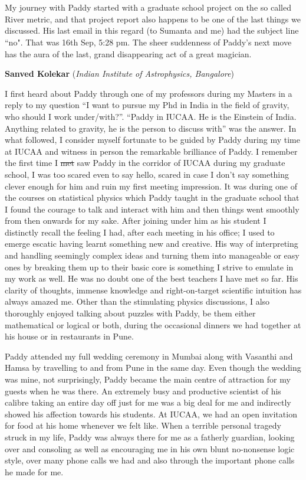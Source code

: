 \documentclass[prd, preprint, longbibliography, 11pt]{revtex4-1}
\begin{document}
\\
\\
My journey with Paddy started with a graduate school project on the so called River metric, and that project report also happens to be one of the last things we discussed. His last email in this regard (to Sumanta and me) had the subject line ``no". That was 16th Sep, 5:28 pm. The sheer suddenness of Paddy's next move has the aura of the last, grand disappearing act of a great magician. 

\bigskip

\bigskip

\centerline{{\bf Sanved Kolekar} ({\it Indian Institute of Astrophysics, Bangalore})}
\medskip
\noindent I first heard about Paddy through one of my professors during my Masters in a reply to my question “I want to pursue my Phd in India in the field of gravity, who should I work under/with?”. “Paddy in IUCAA. He is the Einstein of India. Anything related to gravity, he is the person to discuss with” was the answer. In what followed, I consider myself fortunate to be guided by Paddy during my time at IUCAA and witness in person the remarkable brilliance of Paddy. I remember the first time I \st{met} saw Paddy in the corridor of IUCAA during my graduate school, I was too scared even to say hello, scared in case I don’t say something clever enough for him and ruin my first meeting impression. It was during one of the courses on statistical physics which Paddy taught in the graduate school that I found the courage to talk and interact with him and then things went smoothly from then onwards for my sake. After joining under him as his student I distinctly recall the feeling I had, after each meeting in his office; I used to emerge escatic having learnt something new and creative. His way of interpreting and handling seemingly complex ideas and turning them into manageable or easy ones by breaking them up to their basic core is something I strive to emulate in my work as well. He was no doubt one of the best teachers I have met so far. His clarity of thoughts, immense knowledge and right-on-target scientific intuition has always amazed me. Other than the stimulating physics discussions, I also thoroughly enjoyed talking about puzzles with Paddy, be them either mathematical or logical or both, during the occasional dinners we had together at his house or in restaurants in Pune. 

Paddy attended my full wedding ceremony in Mumbai along with Vasanthi and Hamsa by travelling to and from Pune in the same day. Even though the wedding was mine, not surprisingly, Paddy became the main centre of attraction for my guests when he was there. An extremely busy and productive scientist of his calibre taking an entire day off just for me was a big deal for me and indirectly showed his affection towards his students. At IUCAA, we had an open invitation for food at his home whenever we felt like. When a terrible personal tragedy struck in my life, Paddy was always there for me as a fatherly guardian, looking over and consoling as well as encouraging me in his own blunt no-nonsense logic style, over many phone calls we had and also through the important phone calls he made for me.
\end{document}
